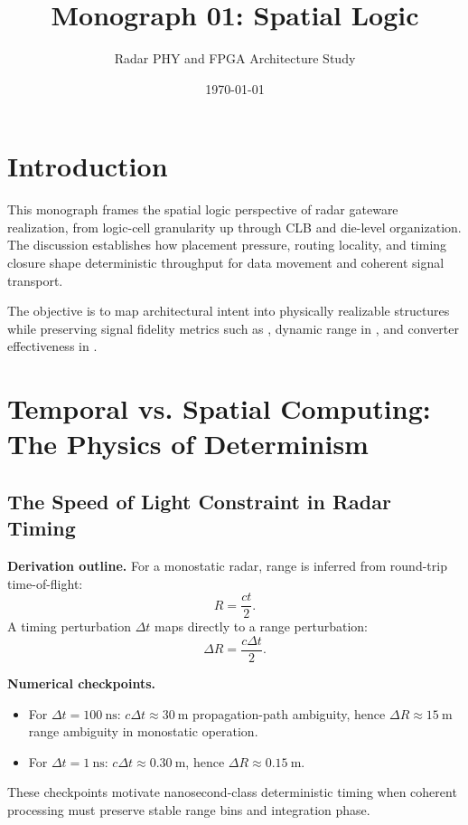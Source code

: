 \documentclass[11pt]{article}
\title{Monograph 01: Spatial Logic}
\author{Radar PHY and FPGA Architecture Study}
\date{\today}
\begin{document}
\maketitle

\section{Introduction}
This monograph frames the spatial logic perspective of radar gateware realization, from logic-cell granularity up through CLB and die-level organization. The discussion establishes how placement pressure, routing locality, and timing closure shape deterministic throughput for \AXIStream data movement and coherent \IandQ signal transport.

The objective is to map architectural intent into physically realizable structures while preserving signal fidelity metrics such as \SNR, dynamic range in \dBFS, and converter effectiveness in \ENOB.

\section{Temporal vs. Spatial Computing: The Physics of Determinism}

\subsection{The Speed of Light Constraint in Radar Timing}
\textbf{Derivation outline.}
For a monostatic radar, range is inferred from round-trip time-of-flight:
\begin{equation}
R=\frac{ct}{2}.
\end{equation}
A timing perturbation \(\Delta t\) maps directly to a range perturbation:
\begin{equation}
\Delta R=\frac{c\Delta t}{2}.
\end{equation}

\textbf{Numerical checkpoints.}
\begin{itemize}
  \item For \(\Delta t=\SI{100}{\nano\second}\): \(c\Delta t\approx\SI{30}{\meter}\) propagation-path ambiguity, hence \(\Delta R\approx\SI{15}{\meter}\) range ambiguity in monostatic operation.
  \item For \(\Delta t=\SI{1}{\nano\second}\): \(c\Delta t\approx\SI{0.30}{\meter}\), hence \(\Delta R\approx\SI{0.15}{\meter}\).
\end{itemize}
These checkpoints motivate nanosecond-class deterministic timing when coherent \IandQ processing must preserve stable range bins and integration phase.
\end{document}
